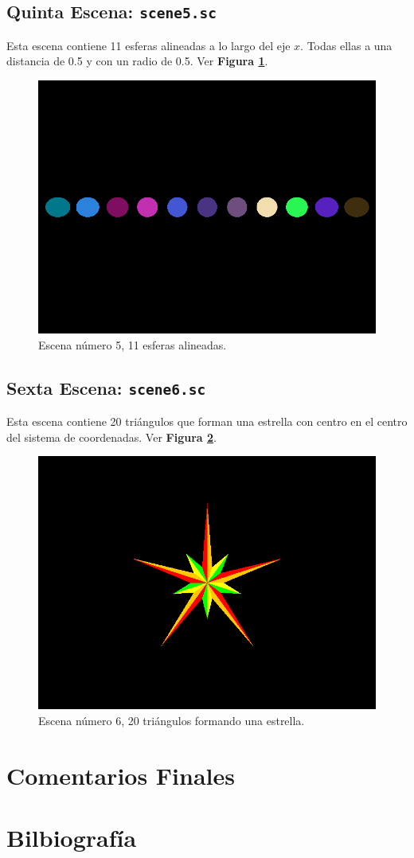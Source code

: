 \documentclass[a4paper,10pt]{article}
\begin{document}
\subsection{Quinta Escena: \texttt{scene5.sc}}
Esta escena contiene 11 esferas alineadas a lo largo del eje $x$.  Todas ellas a una distancia de 0.5 y con un radio de 0.5. Ver \textbf{Figura \ref{fig:5}}.

\begin{figure}[h]
 \centering
 \includegraphics[width=320pt,keepaspectratio=true]{../scene5.png}
 \caption{Escena n\'umero 5, 11 esferas alineadas.}
 \label{fig:5}
\end{figure}

\subsection{Sexta Escena: \texttt{scene6.sc}}
Esta escena contiene 20 tri\'angulos que forman una estrella con centro en el centro del sistema de coordenadas.  Ver \textbf{Figura \ref{fig:6}}.

\begin{figure}[h]
 \centering
 \includegraphics[width=320pt,keepaspectratio=true]{../scene6.png}
 \caption{Escena n\'umero 6, 20 tri\'angulos formando una estrella.}
 \label{fig:6}
\end{figure}

\section{Comentarios Finales}

\section{Bilbiograf\'ia}
\end{document}
